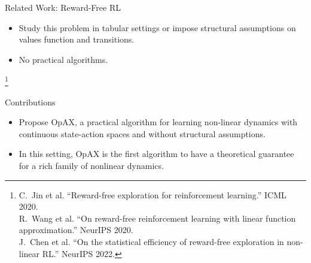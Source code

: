 \documentclass[11pt,aspectratio=169,handout]{beamer} %
\newcommand\reffootnote[1]{%
\begingroup
\renewcommand\thefootnote{}\footnote{\hspace{-20px}\color{DarkGray}#1\vspace{5px}}%
\addtocounter{footnote}{-1}%
\endgroup
}
\begin{document}
\begin{frame}{Related Work: Reward-Free RL}

    \begin{itemize}
        \item Study this problem in tabular settings or impose \textcolor{ETHRed}{structural assumptions on values function and transitions}.
        \item No practical algorithms.
    \end{itemize}

    \reffootnote{C.~Jin et al. ``Reward-free exploration for reinforcement learning.'' ICML 2020.\\
    R.~Wang et al. ``On reward-free reinforcement learning with linear function approximation.'' NeurIPS 2020.\\
    J.~Chen et al. ``On the statistical efficiency of reward-free exploration in non-linear RL.'' NeurIPS 2022.}
\end{frame}


\begin{frame}{Contributions}

    \begin{itemize}
        \item Propose OpAX, a practical algorithm for learning non-linear dynamics with \textcolor{ETHRed}{continuous} state-action spaces and \textcolor{ETHRed}{without} structural assumptions.
        \item In this setting, OpAX is the \textcolor{ETHRed}{first} algorithm to have a theoretical guarantee for a rich family of nonlinear dynamics. 
    \end{itemize}
\end{frame}
\end{document}
